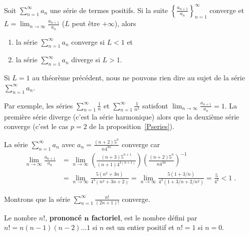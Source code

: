 {\begin{theorem} \label{Alembert}
Soit $\displaystyle \sum_{n=1}^\infty a_n$ une série de termes
positifs.  Si la suite $\displaystyle \left\{ \frac{a_{n+1}}{a_n}
\right\}_{n=1}^\infty$ converge et
$\displaystyle L = \lim_{n\rightarrow \infty} \frac{a_{n+1}}{a_n}$
($L$ peut être $+\infty$), alors
\begin{enumerate}
\item la série $\displaystyle \sum_{n=1}^\infty a_n$ converge si $L<1$ et
\item la série $\displaystyle \sum_{n=1}^\infty a_n$ diverge si $L>1$.
\end{enumerate}
\end{theorem}

\begin{rmk}
Si $L=1$ au théorème précédent, nous ne pouvons rien dire au sujet de la
série $\displaystyle \sum_{n=1}^\infty a_n$.

Par exemple, les séries $\displaystyle \sum_{n=1}^\infty \frac{1}{n}$
et $\displaystyle \sum_{n=1}^\infty \frac{1}{n^2}$ satisfont
$\displaystyle \lim_{n\rightarrow \infty} \frac{a_{n+1}}{a_n} = 1$.
La première série diverge (c'est la série harmonique) alors que la
deuxième série converge (c'est le cas $p=2$ de la
proposition~\ref{Pseries}).
\label{dAlembert1}
\end{rmk}

\begin{egg}
La série $\displaystyle \sum_{n=1}^\infty a_n$ avec
$\displaystyle a_n = \frac{(n+2)5^n}{n 4^{3n}}$ converge car
\begin{align*}
\lim_{n\rightarrow \infty} \frac{a_{n+1}}{a_n} &=
\lim_{n\rightarrow \infty} \left( \frac{(n+3)5^{n+1}}{(n+1) 4^{3(n+1)}}
\right) \left( \frac{(n+2)5^n}{n 4^{3n}} \right)^{-1} \\
&=\lim_{n\rightarrow \infty} \frac{5(n^2+3n)}{4^3(n^2+3n+2)}
=\lim_{n\rightarrow \infty} \frac{5(1+3/n)}{4^3(1+3/n+2/n^2)}
= \frac{5}{4^3} < 1 \; .
\end{align*}
\end{egg}

\begin{egg}
Montrons que la série
$\displaystyle \sum_{n=1}^\infty \frac{n!}{(2n+1)!}$ converge.

Le nombre $n!$,
{\bfseries prononcé $\mathbf n$ factoriel},
est le nombre défini par $n! = n(n-1)(n-2)\ldots 1$
si $n$ est un entier positif et $n! = 1$ si $n=0$.


\end{egg}}
